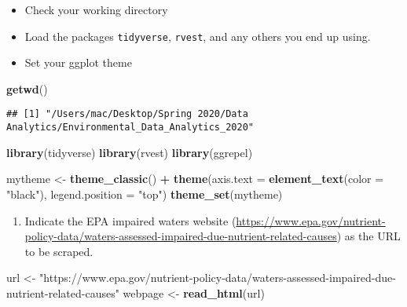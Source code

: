 \documentclass[]{article}
\newenvironment{Shaded}{\begin{snugshade}}{\end{snugshade}}
\newcommand{\DataTypeTok}[1]{\textcolor[rgb]{0.13,0.29,0.53}{#1}}
\newcommand{\KeywordTok}[1]{\textcolor[rgb]{0.13,0.29,0.53}{\textbf{#1}}}
\newcommand{\NormalTok}[1]{#1}
\newcommand{\OperatorTok}[1]{\textcolor[rgb]{0.81,0.36,0.00}{\textbf{#1}}}
\newcommand{\StringTok}[1]{\textcolor[rgb]{0.31,0.60,0.02}{#1}}
\providecommand{\tightlist}{%
  \setlength{\itemsep}{0pt}\setlength{\parskip}{0pt}}
\begin{document}
\begin{itemize}
\tightlist
\item
  Check your working directory
\item
  Load the packages \texttt{tidyverse}, \texttt{rvest}, and any others
  you end up using.
\item
  Set your ggplot theme
\end{itemize}

\begin{Shaded}
\begin{Highlighting}[]
\KeywordTok{getwd}\NormalTok{()}
\end{Highlighting}
\end{Shaded}

\begin{verbatim}
## [1] "/Users/mac/Desktop/Spring 2020/Data Analytics/Environmental_Data_Analytics_2020"
\end{verbatim}

\begin{Shaded}
\begin{Highlighting}[]
\KeywordTok{library}\NormalTok{(tidyverse)}
\KeywordTok{library}\NormalTok{(rvest)}
\KeywordTok{library}\NormalTok{(ggrepel)}

\NormalTok{mytheme <-}\StringTok{ }\KeywordTok{theme_classic}\NormalTok{() }\OperatorTok{+}
\StringTok{  }\KeywordTok{theme}\NormalTok{(}\DataTypeTok{axis.text =} \KeywordTok{element_text}\NormalTok{(}\DataTypeTok{color =} \StringTok{"black"}\NormalTok{), }
        \DataTypeTok{legend.position =} \StringTok{"top"}\NormalTok{)}
\KeywordTok{theme_set}\NormalTok{(mytheme)}
\end{Highlighting}
\end{Shaded}

\begin{enumerate}
\def\labelenumi{\arabic{enumi}.}
\setcounter{enumi}{1}
\tightlist
\item
  Indicate the EPA impaired waters website
  (\url{https://www.epa.gov/nutrient-policy-data/waters-assessed-impaired-due-nutrient-related-causes})
  as the URL to be scraped.
\end{enumerate}

\begin{Shaded}
\begin{Highlighting}[]
\NormalTok{url <-}\StringTok{ "https://www.epa.gov/nutrient-policy-data/waters-assessed-impaired-due-nutrient-related-causes"}
\NormalTok{webpage <-}\StringTok{ }\KeywordTok{read_html}\NormalTok{(url)}
\end{Highlighting}
\end{Shaded}
\end{document}
